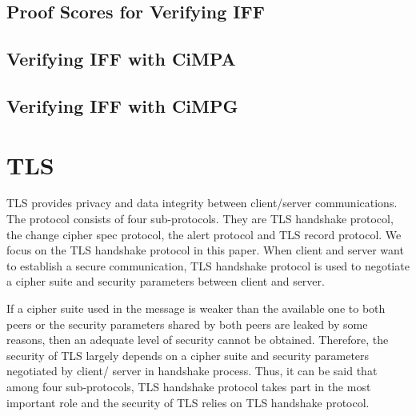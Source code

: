 \documentclass[a4paper,fleqn]{cas-dc}
\begin{document}
\subsection{Proof Scores for Verifying IFF} \label{pscores}

\subsection{Verifying IFF with CiMPA} \label{cimpa}

\subsection{Verifying IFF with CiMPG} \label{cimpg}

\section{TLS}\label{tls}
TLS \cite{dierk} provides privacy and data integrity between client/server communications. The protocol consists of four sub-protocols. They are TLS handshake protocol, the change cipher spec protocol, the alert protocol and TLS record protocol. We focus on the TLS handshake protocol in this paper. When client and server want to establish a secure communication, TLS handshake protocol is used to negotiate a cipher suite and security parameters between client and server. 


If a cipher suite used in the message is weaker than the available one to both peers or the security parameters shared by both peers are leaked by some reasons, then an adequate level of security cannot be obtained. Therefore, the security of TLS largely depends on a cipher suite and security parameters negotiated by client/ server in handshake process. Thus, it can be said that among four sub-protocols, TLS handshake protocol takes part in the most important role and the security of TLS relies on TLS handshake protocol. 
\end{document}
